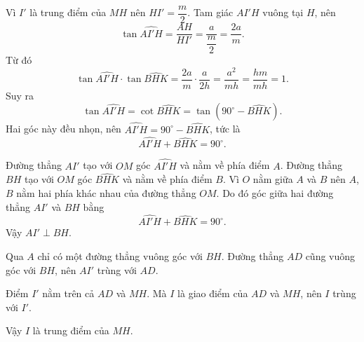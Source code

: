 \begin{bt}[2,5 điểm]
{\begin{enumerate}
Vì $I'$ là trung điểm của $MH$ nên $HI'=\dfrac{m}{2}$. Tam giác $AI'H$ vuông tại $H$, nên
\[
\tan\widehat{AI'H}=\dfrac{AH}{HI'}=\dfrac{a}{\dfrac{m}{2}}=\dfrac{2a}{m}.
\]
Từ đó
\[
\tan\widehat{AI'H}\cdot\tan\widehat{BHK}
=\dfrac{2a}{m}\cdot\dfrac{a}{2h}
=\dfrac{a^2}{mh}
=\dfrac{hm}{mh}
=1.
\]
Suy ra
\[
\tan\widehat{AI'H}=\cot\widehat{BHK}=\tan\left(90^\circ-\widehat{BHK}\right).
\]
Hai góc này đều nhọn, nên $\widehat{AI'H}=90^\circ-\widehat{BHK}$, tức là
\[
\widehat{AI'H}+\widehat{BHK}=90^\circ.
\]

Đường thẳng $AI'$ tạo với $OM$ góc $\widehat{AI'H}$ và nằm về phía điểm $A$. Đường thẳng $BH$ tạo với $OM$ góc $\widehat{BHK}$ và nằm về phía điểm $B$. Vì $O$ nằm giữa $A$ và $B$ nên $A$, $B$ nằm hai phía khác nhau của đường thẳng $OM$. Do đó góc giữa hai đường thẳng $AI'$ và $BH$ bằng
\[
\widehat{AI'H}+\widehat{BHK}=90^\circ.
\]
Vậy $AI'\perp BH$.

Qua $A$ chỉ có một đường thẳng vuông góc với $BH$. Đường thẳng $AD$ cũng vuông góc với $BH$, nên $AI'$ trùng với $AD$.

Điểm $I'$ nằm trên cả $AD$ và $MH$. Mà $I$ là giao điểm của $AD$ và $MH$, nên $I$ trùng với $I'$.

Vậy $I$ là trung điểm của $MH$.
\end{enumerate}
}
\end{bt}

